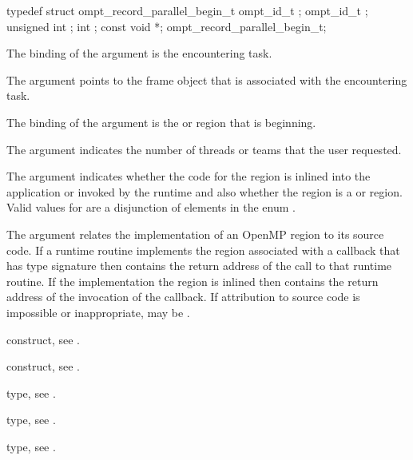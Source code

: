 \record
\begin{ccppspecific}
\begin{omptRecord}
typedef struct ompt_record_parallel_begin_t {
  ompt_id_t ;
  ompt_id_t ;
  unsigned int ;
  int ;
  const void *;
} ompt_record_parallel_begin_t;
\end{omptRecord}
\end{ccppspecific}

\argdesc
The binding of the  argument is the encountering task.

The  argument points to the frame object that is
associated with the encountering task.

The binding of the  argument is the  or 
region that is beginning.

The  argument indicates the number of threads or 
teams that the user requested.

The  argument indicates whether the code for the region is inlined 
into the application or invoked by the runtime and also whether the region is 
a  or  region. Valid values for  are a 
disjunction of elements in the enum .

The  argument relates the implementation of an OpenMP region 
to its source code. If a runtime routine implements the region associated with 
a callback that has type signature  then 
 contains the return address of the call to that runtime routine.  
If the implementation the region is inlined then  contains the
return address of the invocation of the callback. If attribution to source code 
is impossible or inappropriate,  may be .

\begin{crossrefs}
\item {} construct, see .

\item {} construct, see .

\item {} type, see .

\item {} type, see .

\item {} type, see .
\end{crossrefs}



